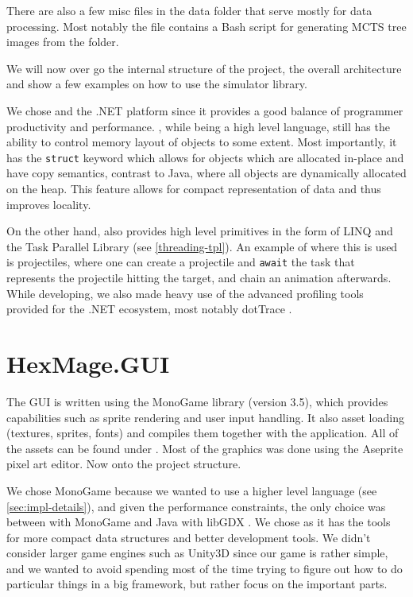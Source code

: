 There are also a few misc files in the data folder that serve mostly for data processing. Most notably the  file contains a Bash \citep{bash} script for generating MCTS tree images from the  folder.

We will now over go the internal structure of the project, the overall architecture and show a few examples on how to use the simulator library.

We chose \Csh{} and the .NET platform since it provides a good balance of programmer productivity and performance. \Csh{}, while being a high level language, still has the ability to control memory layout of objects to some extent. Most importantly, it has the \verb|struct| keyword which allows for objects which are allocated in-place and have copy semantics, contrast to Java, where all objects are dynamically allocated on the heap. This feature allows for compact representation of data and thus improves locality.

On the other hand, \Csh{} also provides high level primitives in the form of LINQ and the Task Parallel Library \citep{tpl} (see \autoref{threading-tpl}). An example of where this is used is projectiles, where one can create a projectile and \verb|await| the task that represents the projectile hitting the target, and chain an animation afterwards. While developing, we also made heavy use of the advanced profiling tools provided for the .NET ecosystem, most notably dotTrace \citep{dot-trace}.

\section{HexMage.GUI}

The GUI is written using the MonoGame \citep{monogame} library (version 3.5), which provides capabilities such as sprite rendering and user input handling. It also asset loading (textures, sprites, fonts) and compiles them together with the application. All of the assets can be found under . Most of the graphics was done using the Aseprite \citep{aseprite} pixel art editor. Now onto the project structure.

We chose MonoGame because we wanted to use a higher level language (see \autoref{sec:impl-details}), and given the performance constraints, the only choice was between \Csh with MonoGame and Java with libGDX \citep{libgdx}. We chose \Csh as it has the tools for more compact data structures and better development tools. We didn't consider larger game engines such as Unity3D \citep{unity3d} since our game is rather simple, and we wanted to avoid spending most of the time trying to figure out how to do particular things in a big framework, but rather focus on the important parts.

